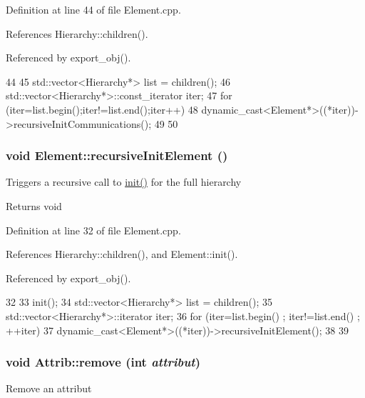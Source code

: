 Definition at line 44 of file Element.cpp.

References Hierarchy::children().

Referenced by export\_\-obj().


\begin{DoxyCode}
44                                          {
45   std::vector<Hierarchy*> list = children();
46   std::vector<Hierarchy*>::const_iterator iter;
47   for (iter=list.begin();iter!=list.end();iter++){
48     dynamic_cast<Element*>((*iter))->recursiveInitCommunications();
49   }
50 }
\end{DoxyCode}
\hypertarget{classElement_a3c0abcb36f8906688bb7e32608df7086}{
\subsubsection[{recursiveInitElement}]{\setlength{\rightskip}{0pt plus 5cm}void Element::recursiveInitElement ()}}
\label{classElement_a3c0abcb36f8906688bb7e32608df7086}
Triggers a recursive call to \hyperlink{classElement_af42754b5cabc198869222725218d695c}{init()} for the full hierarchy

\begin{DoxyReturn}{Returns}
void 
\end{DoxyReturn}


Definition at line 32 of file Element.cpp.

References Hierarchy::children(), and Element::init().

Referenced by export\_\-obj().


\begin{DoxyCode}
32                                   {
33   init();
34   std::vector<Hierarchy*> list = children();
35   std::vector<Hierarchy*>::iterator iter;
36   for (iter=list.begin() ; iter!=list.end() ; ++iter){
37     dynamic_cast<Element*>((*iter))->recursiveInitElement();
38   }
39 }
\end{DoxyCode}
\hypertarget{classAttrib_a7d4ef7e32d93cb287792b87b857e79f3}{
\subsubsection[{remove}]{\setlength{\rightskip}{0pt plus 5cm}void Attrib::remove (int {\em attribut})}}
\label{classAttrib_a7d4ef7e32d93cb287792b87b857e79f3}
Remove an attribut 

